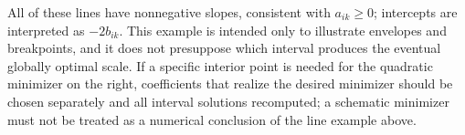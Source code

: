 All of these lines have nonnegative slopes, consistent with $a_{ik}\ge0$; intercepts are interpreted as $-2b_{ik}$.
This example is intended only to illustrate envelopes and breakpoints, and it does not presuppose which interval produces the eventual globally optimal scale.
If a specific interior point is needed for the quadratic minimizer on the right, coefficients that realize the desired minimizer should be chosen separately and all interval solutions recomputed; a schematic minimizer must not be treated as a numerical conclusion of the line example above.
